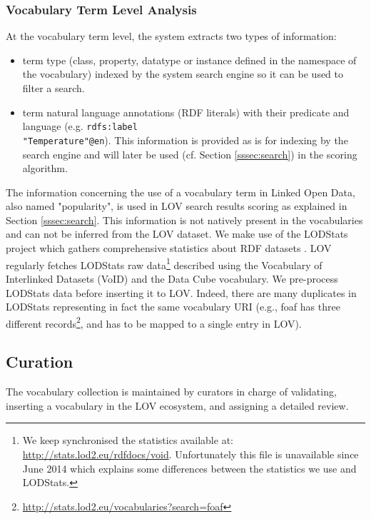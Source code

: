 \documentclass{iosart2c}
\newcommand{\maria}[1]{\textcolor{blue}{\textbf{[MARIA:#1]}}}
\begin{document}
\subsubsection{Vocabulary Term Level Analysis}
At the vocabulary term level, the system extracts two types of information:
\begin{itemize}
\item term type (class, property, datatype or instance defined in the namespace of the vocabulary) indexed by the system search engine so it can be used to filter a search.
\item term natural language annotations (RDF literals) with their predicate and language (e.g. {\small\texttt{rdfs:label}}\\ {\small\texttt{"Temperature"@en}}). This information is provided as is for indexing by the search engine and will later be used (cf. Section \ref{sssec:search}) in the scoring algorithm.
\end{itemize}

The information concerning the use of a vocabulary term in Linked Open Data, also named "popularity", is used in LOV search results scoring as explained in Section \ref{sssec:search}. This information is not natively present in the vocabularies and can not be inferred from the LOV dataset. We make use of the LODStats project which gathers comprehensive statistics about RDF datasets \cite{demter-2012-ekaw}. LOV regularly fetches LODStats raw data\footnote{We keep synchronised the statistics available at: \url{http://stats.lod2.eu/rdfdocs/void}. Unfortunately this file is unavailable since June 2014 which explains some differences between the statistics we use and LODStats.} described using the Vocabulary of Interlinked Datasets (VoID) \cite{void2009} and the Data Cube vocabulary. We pre-process LODStats data before inserting it to LOV. Indeed, there are many duplicates in LODStats representing in fact the same vocabulary URI (e.g., foaf has three different records\footnote{\url{http://stats.lod2.eu/vocabularies?search=foaf}}, and has to be mapped to a single entry in LOV).

\subsection{Curation}
The vocabulary collection is maintained by curators in charge of validating, inserting a vocabulary in the LOV ecosystem, and assigning a detailed review.

\end{document}
